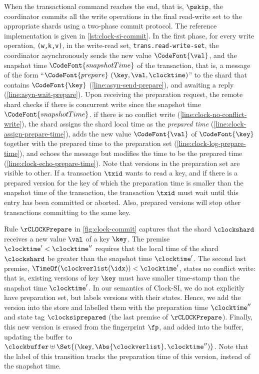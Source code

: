 When the transactional command reaches the end, that is, \( \pskip \),
the coordinator commits all the write operations in the final read-write set 
to the appropriate shards using a two-phase commit protocol.
The reference implementation is given in \cref{lst:clock-si-commit}.
In the first phase, 
for every write operation, \verb|(w,k,v)|, in the write-read set, \verb|trans.read-write-set|,
the coordinator asynchronously sends the new value \( \CodeFont{\val} \),
and the snapshot time \( \CodeFont{snapshotTime} \) of the transaction,
that is, a message of the form ``\(\CodeFont{prepare} \ (\key,\val,\clocktime)\)''
to the shard that contains \( \CodeFont{\key} \) (\cref{line:asyn-send-prepare}), 
and awaiting a reply (\cref{line:asyn-wait-prepare}).
Upon receiving the preparation request, 
the remote shard checks if there is concurrent write since the snapshot time \( \CodeFont{snapshotTime} \).
if there is no conflict write (\cref{line:clock-no-conflict-write}),
the shard assigns the shard local time as the \emph{prepared time} (\cref{line:clock-assign-prepare-time}),
adds the new value \( \CodeFont{\val} \) of \( \CodeFont{\key} \) together with the prepared time to the preparation set (\cref{line:clock-log-prepare-time}), 
and echoes the message but modifies the time to be the prepared time (\cref{line:clock-echo-prepare-time}).
Note that versions in the preparation set are visible to other.
If a transaction \( \txid\) wants to read a key, and 
if there is a prepared version for the key of which the preparation time is smaller 
than the snapshot time of the transaction,
the transaction \( \txid\) must wait until this entry has been committed or aborted.
Also, prepared versions will stop other transactions committing to the same key.

Rule \( \rCLOCKPrepare \) in \cref{fig:clock-commit} captures that
the shard \( \clockshard \) receives a new value \( \val \) of a key \( \key \).
The premise \(\clocktime' < \clocktime'' \) requires 
that the local time of the shard \( \clockshard \) 
be greater than the snapshot time \( \clocktime' \).
The second last premise, \( \TimeOf(\clockverlist(\idx)) < \clocktime' \), states no conflict write: that is, 
existing versions of key \( \key \) must have smaller time-stamp than the snapshot time \( \clocktime' \).
In our semantics of Clock-SI, we do not explicitly have preparation set,
but labels versions with their states.
Hence, we add the version into the store and 
labelled them with the preparation time \( \clocktime'' \) and state tag \( \clocksiprepared \) 
(the last premise of \( \rCLOCKPrepare \)).
Finally, this new version is erased from the fingerprint \( \fp \),
and added into the buffer, updating the buffer to \( \clockbuffer \uplus \Set{(\key,\Abs{\clockverlist},\clocktime'') } \).
Note that the label of this transition tracks the preparation time of this version, 
instead of the snapshot time.

